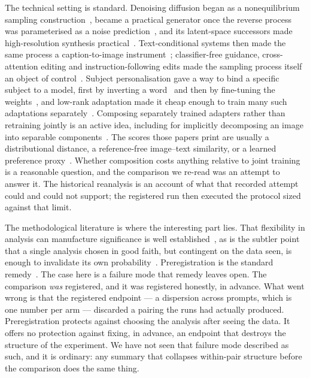 The technical setting is standard. Denoising diffusion began as a
nonequilibrium sampling construction~\cite{sohldickstein2015deep}, became a
practical generator once the reverse process was parameterised as a noise
prediction~\cite{ho2020ddpm,nichol2021improved,song2020ddim,song2021score,
dhariwal2021diffusion,karras2022edm,croitoru2023survey}, and its latent-space
successors made high-resolution synthesis
practical~\cite{rombach2022ldm,podell2023sdxl,goodfellow2014gan,
isola2017pix2pix}. Text-conditional systems then made the same process a
caption-to-image instrument~\cite{ramesh2021dalle,nichol2021glide,
ramesh2022dalle2,saharia2022imagen,schuhmann2022laion}; classifier-free
guidance, cross-attention editing and instruction-following edits made the
sampling process itself an object of
control~\cite{ho2022cfg,hertz2022prompt,zhang2023controlnet,meng2021sdedit,
brooks2023instruct}. Subject personalisation gave a way to bind a specific
subject to a model, first by inverting a word~\cite{gal2022textual} and then by
fine-tuning the weights~\cite{ruiz2023dreambooth}, and low-rank adaptation made
it cheap enough to train many such adaptations
separately~\cite{hu2022lora,han2023svdiff,kumari2023custom,ye2023ipadapter}.
Composing separately trained adapters rather than retraining jointly is an
active idea, including for implicitly decomposing an image into separable
components~\cite{blora}. The scores those papers print are usually a
distributional distance, a reference-free image--text similarity, or a learned
preference
proxy~\cite{heusel2017fid,radford2021clip,hessel2021clipscore,
kirstain2023pick,wu2023hps,xu2023imagereward}. Whether
composition costs anything relative to joint training is a reasonable question,
and the comparison we re-read was an attempt to answer it. The historical
reanalysis is an account of what that recorded attempt could and could not
support; the registered run then executed the protocol sized against that
limit.

The methodological literature is where the interesting part lies. That
flexibility in analysis can manufacture significance is well
established~\cite{simmons2011false,head2015phacking,ioannidis2005why,
openscience2015repro}, as is the subtler point that a single analysis chosen in
good faith, but contingent on the data seen, is enough to invalidate its own
probability~\cite{gelman2014garden}. Preregistration is the standard
remedy~\cite{nosek2018preregistration,munafo2017manifesto,pineau2021improving,
goodman2016mean}. The case here is a failure mode that remedy leaves open. The
comparison \emph{was} registered, and it was registered honestly, in advance.
What went wrong is that the registered endpoint --- a dispersion across
prompts, which is one number per arm --- discarded a pairing the runs had
actually produced. Preregistration protects against choosing the analysis
after seeing the data. It offers no protection against fixing, in advance, an
endpoint that destroys the structure of the experiment. We have not seen that
failure mode described as such, and it is ordinary: any summary that collapses
within-pair structure before the comparison does the same thing.

